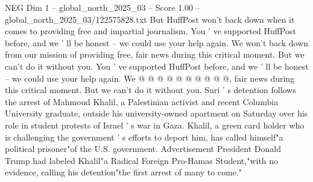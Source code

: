 \begin{textsample}{NEG Dim 1 – global\_north\_2025\_03 – Score 1.00 – global\_north\_2025\_03/122575828.txt}
But HuffPost won't back down when it comes to providing free and impartial journalism.
You ' ve supported HuffPost before, and we ' ll be honest -- we could use your help again.
We won't back down from our mission of providing free, fair news during this critical moment.
But we can't do it without you.
You ' ve supported HuffPost before, and we ' ll be honest -- we could use your help again.
We @ @ @ @ @ @ @ @ @ @, fair news during this critical moment.
But we can't do it without you.
Suri ' s detention follows the arrest of Mahmoud Khalil, a Palestinian activist and recent Columbia University graduate, outside his university-owned apartment on Saturday over his role in student protests of Israel ' s war in Gaza.
Khalil, a green card holder who is challenging the government ' s efforts to deport him, has called himself"a political prisoner"of the U.S. government.
Advertisement President Donald Trump had labeled Khalil"a Radical Foreign Pro-Hamas Student,"with no evidence, calling his detention"the first arrest of many to come."

\end{textsample}
